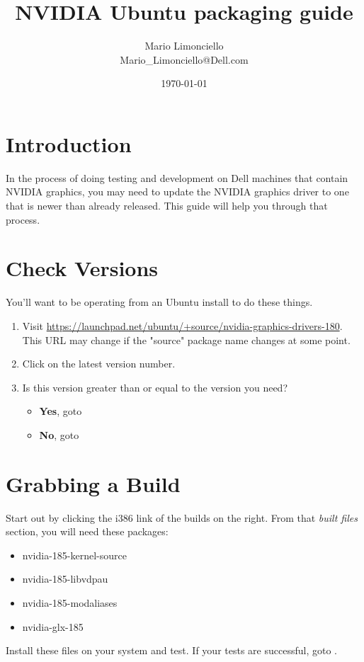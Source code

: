 \documentclass[letterpaper,10pt,titlepage]{article}
\title{\textbf{NVIDIA Ubuntu packaging guide}}
\author{Mario Limonciello\\ Mario\_Limonciello@Dell.com}
\date{\today}
\begin{document}
\maketitle

\tableofcontents
\newpage

\section{Introduction}
In the process of doing testing and development on Dell machines that contain NVIDIA graphics, you may need to update the NVIDIA graphics driver
to one that is newer than already released.  This guide will help you through that process.

\section{Check Versions}
You'll want to be operating from an Ubuntu install to do these things.
\begin{enumerate}
\item Visit \url{https://launchpad.net/ubuntu/+source/nvidia-graphics-drivers-180}. This URL may change if the "source" package name changes at some point.
\item Click on the latest version number.
\item Is this version greater than or equal to the version you need?
  \begin{itemize}
    \item \textbf{Yes}, goto 
    \item \textbf{No},  goto 
  \end{itemize}
\end{enumerate}

\section{Grabbing a Build} \label{grabbing}
Start out by clicking the i386 link of the builds on the right.  From that \textit{built files} section, you will need these packages:
\begin{itemize}
\item nvidia-185-kernel-source
\item nvidia-185-libvdpau
\item nvidia-185-modaliases
\item nvidia-glx-185
\end{itemize}
Install these files on your system and test.  If your tests are successful, goto .
\end{document}
